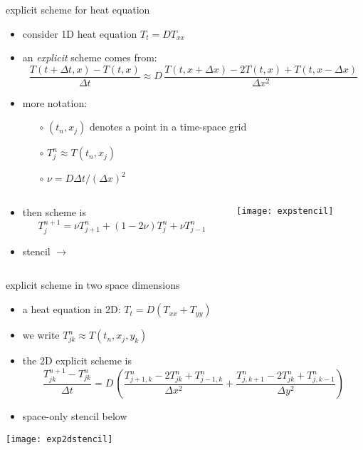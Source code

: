 \begin{frame}{explicit scheme for heat equation}
\label{slide:explicit}

\begin{itemize}
\item consider 1D heat equation $T_t = D T_{xx}$
\item an \emph{explicit} scheme comes from:
\small
	$$\frac{T(t+\Delta t,x) - T(t,x)}{\Delta t} \approx D\,\frac{T(t,x+\Delta x) - 2 T(t,x) + T(t,x-\Delta x)}{\Delta x^2}$$
\normalsize
\item more notation:
  \begin{itemize}
  \item[$\circ$] $(t_n,x_j)$ denotes a point in a time-space grid
  \item[$\circ$] $T_j^n \approx T(t_n,x_j)$
  \item[$\circ$] $\nu = D \Delta t / (\Delta x)^2$
  \end{itemize}
\end{itemize}

\begin{columns}
\begin{column}{0.6\textwidth}
\begin{itemize}
\item then scheme is
	$$T_j^{n+1} = \nu T_{j+1}^n + (1 - 2 \nu) T_j^n + \nu T_{j-1}^n$$
\item stencil \large $\to$ \normalsize
\end{itemize}
\end{column}
\begin{column}{0.4\textwidth}
\hspace{5mm}\texttt{[image: expstencil]}
\end{column}
\end{columns}
\end{frame}


\begin{frame}{explicit scheme in two space dimensions}

\begin{itemize}
\item a heat equation in 2D: \quad $T_t = D(T_{xx} + T_{yy})$
\item we write $T_{jk}^n \approx T(t_n,x_j,y_k)$
\item the 2D explicit scheme is
\small
	$$\frac{T_{jk}^{n+1} - T_{jk}^n}{\Delta t} = D\,\left(\frac{T_{j+1,k}^n - 2 T_{jk}^n + T_{j-1,k}^n}{\Delta x^2} + \frac{T_{j,k+1}^n - 2 T_{jk}^n + T_{j,k-1}^n}{\Delta y^2}\right)$$
\normalsize
\item space-only stencil below
\end{itemize}

\bigskip
\begin{center}
\texttt{[image: exp2dstencil]}
\end{center}
\end{frame}


